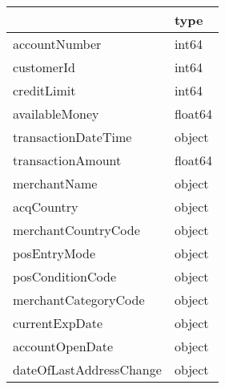 \begin{tabu}{ll}
\toprule
 & type \\
\midrule
accountNumber & int64 \\
customerId & int64 \\
creditLimit & int64 \\
availableMoney & float64 \\
transactionDateTime & object \\
transactionAmount & float64 \\
merchantName & object \\
acqCountry & object \\
merchantCountryCode & object \\
posEntryMode & object \\
posConditionCode & object \\
merchantCategoryCode & object \\
currentExpDate & object \\
accountOpenDate & object \\
dateOfLastAddressChange & object \\
\bottomrule
\end{tabu}